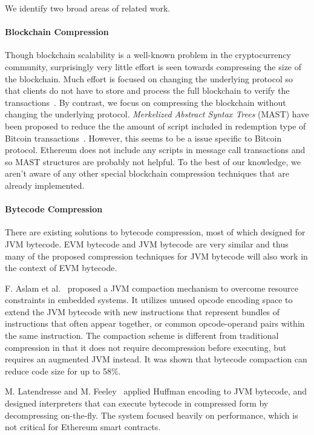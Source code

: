 We identify two broad areas of related work.

\paragraph{Blockchain Compression}
Though blockchain scalability is a well-known problem in the cryptocurrency community,
surprisingly very little effort is seen towards compressing the size of the blockchain.
Much effort is focused on changing the underlying protocol so that clients
do not have to store and process the full blockchain to verify the transactions~\cite{lightclient, ultimate}.
By contrast, we focus on compressing the blockchain without changing the underlying protocol.
\emph{Merkelized Abstract Syntax Trees} (MAST) have been proposed to reduce the the amount of script included in redemption
type of Bitcoin transactions~\cite{mast}. 
However, this seems to be a issue specific to Bitcoin protocol.  
Ethereum does not include any scripts in message call transactions and so  MAST structures are probably not helpful.
To the best of our knowledge, we aren't aware of any other special blockchain compression techniques that are already implemented. 


\paragraph{Bytecode Compression}
There are existing solutions to bytecode compression, most of which designed for JVM bytecode.
EVM bytecode and JVM bytecode are very similar and thus many of the proposed compression techniques for JVM bytecode
will also work in the context of EVM bytecode.

F. Aslam et al.~\cite{aslam2010} proposed a JVM compaction mechanism to overcome resource constraints in embedded systems.
It utilizes unused opcode encoding space to extend the JVM bytecode with new instructions that represent bundles of
instructions that often appear together, or common opcode-operand pairs within the same instruction.
The compaction scheme is different from traditional compression in that it does not require decompression before executing,
but requires an augmented JVM instead. It was shown that bytecode compaction can reduce code size for up to 58\%.

M. Latendresse and M. Feeley~\cite{marc2003} applied Huffman encoding to JVM bytecode, and designed interpreters that
can execute bytecode in compressed form by decompressing on-the-fly.
The system focused heavily on performance, which is not critical for Ethereum smart contracts.

